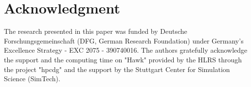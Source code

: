 \documentclass[final,5p]{elsarticle}
\begin{document}






\section*{Acknowledgment} %
The research presented in this paper was funded by Deutsche Forschungsgemeinschaft (DFG, German Research Foundation) under Germany's Excellence Strategy - EXC 2075 - 390740016.
The authors gratefully acknowledge the support and the computing time on "Hawk" provided by the HLRS through the project "hpcdg" and the support by the Stuttgart Center for Simulation Science (SimTech).
\appendix






\end{document}
